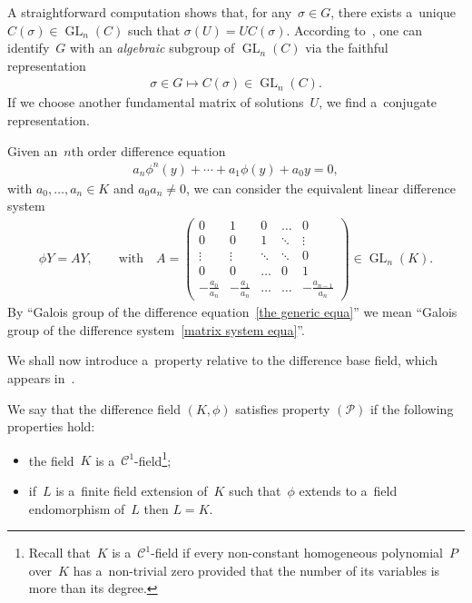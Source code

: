 \documentclass[11pt]{article}
\numberwithin{equation}{section}
\begin{document}
A straightforward computation shows that, for any~$\sigma {\in} G$, there exists a~unique ${C(\sigma) {\in}
\operatorname{GL}_{n}(C)}$ such that $\sigma(U)=UC(\sigma)$.
According to~\cite[Theorem~1.13]{VdPS97}, one can identify~$G$ with an {\it algebraic} subgroup of
$\operatorname{GL}_{n}(C)$ via the faithful representation
\begin{gather*}
\sigma \in G \mapsto C(\sigma) \in \operatorname{GL}_{n}(C).
\end{gather*}
If we choose another fundamental matrix of solutions~$U$, we f\/ind a~conjugate representation.

\begin{Remark}
Given an~$n$th order dif\/ference equation
\begin{gather}
\label{the generic equa}
a_{n} \phi^{n} (y) + \cdots + a_{1} \phi(y)+a_{0} y=0,
\end{gather}
with $a_{0},\dots,a_{n} \in K$ and $a_{0}a_{n} \neq 0$, we can consider the equivalent linear dif\/ference system
\begin{gather}
\label{matrix system equa}
\phi Y=AY, \qquad \text{with} \quad  A=
\begin{pmatrix}
0&1&0&\dots&0
\\
0&0&1&\ddots&\vdots
\\
\vdots&\vdots&\ddots&\ddots&0
\\
0&0&\dots&0&1
\\
-\frac{a_{0}}{a_{n}}& -\frac{a_{1}}{a_{n}}&\dots & \dots & -\frac{a_{n-1}}{a_{n}}
\end{pmatrix}
\in \operatorname{GL}_{n}(K).
\end{gather}
By ``Galois group of the dif\/ference equation~\eqref{the generic equa}'' we mean ``Galois group of the dif\/ference
system~\eqref{matrix system equa}''.
\end{Remark}

We shall now introduce a~property relative to the dif\/ference base f\/ield, which appears in~\cite[Lemma~1.19]{VdPS97}.

\begin{Definition}
\label{prop P}
We say that the dif\/ference f\/ield $(K,\phi)$ satisf\/ies property $(\mathcal{P})$ if the following properties hold:
\begin{itemize}\itemsep=0pt
\item the f\/ield~$K$ is a~$\mathcal{C}^{1}$-f\/ield\footnote{Recall that~$K$ is a~$\mathcal{C}^{1}$-f\/ield if every
non-constant homogeneous polynomial~$P$ over~$K$ has a~non-trivial zero provided that the number of its variables is
more than its degree.};
\item if~$L$ is a~f\/inite f\/ield extension of~$K$ such that~$\phi$ extends to a~f\/ield endomorphism of~$L$ then $L=K$.
\end{itemize}
\end{Definition}
\end{document}
